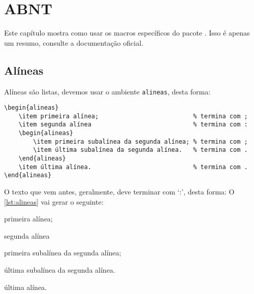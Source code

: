 \chapter{ABNT} \label{chap:fundamentacao}

Este capítulo mostra como usar os macros específicos do pacote \abntex. Isso é apenas um resumo, consulte a documentação oficial.

\section{Alíneas}

Alíneas são listas, devemos usar o ambiente \texttt{alineas}, desta forma:

\begin{lstlisting}[float=htb, style=latexStyle, caption={Alíneas}, label=lst:alineas]
\begin{alineas}
	\item primeira alínea;                          % termina com ;
	\item segunda alínea                            % termina com :
	\begin{alineas}
		\item primeira subalínea da segunda alínea; % termina com ;
		\item última subalínea da segunda alínea.   % termina com .
	\end{alineas}
	\item última alínea.                            % termina com .
\end{alineas}
\end{lstlisting}

O texto que vem antes, geralmente, deve terminar com \enquote*{:}, desta forma: O \autoref{lst:alineas} vai gerar o seguinte:

\begin{alineas}
	\item primeira alínea;                          %
	\item segunda alínea                            %
	\begin{alineas}
		\item primeira subalínea da segunda alínea; %
		\item última subalínea da segunda alínea.   %
	\end{alineas}
	\item última alínea.                            %
\end{alineas}

